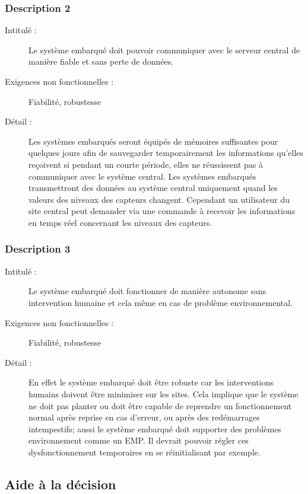 \subsubsection {Description 2}
\begin{description}
           \item[Intitulé :] Le système embarqué doit pouvoir communiquer avec le serveur central de manière fiable et sans perte de données.
           \item[Exigences non fonctionnelles :] Fiabilité, robustesse
           \item[Détail :] Les systèmes embarqués seront équipés de mémoires suffisantes pour quelques jours afin de sauvegarder temporairement les informations qu'elles reçoivent si pendant un courte période, elles ne réussissent pas à communiquer avec le système central. Les systèmes embarqués transmettront des données au système central uniquement quand les valeurs des niveaux des capteurs changent. Cependant un utilisateur du site central
peut demander via une commande à recevoir les informations en temps réel concernant les niveaux des capteurs.
\end{description}

\subsubsection {Description 3}
\begin{description}
           \item[Intitulé :] Le système embarqué doit fonctionner de manière autonome sans intervention humaine et cela même en cas de problème
environnemental.
           \item[Exigences non fonctionnelles :]Fiabilité, robustesse
           \item[Détail :] En effet le système embarqué doit être robuste car les interventions humains doivent être minimiser sur
les sites. Cela implique que le système ne doit pas planter ou doit être capable de reprendre un fonctionnement normal
après reprise en cas d'erreur, ou après des redémarrages intempestifs; aussi le système embarqué doit supporter des 
problèmes environnement comme un EMP. Il devrait pouvoir régler ces dysfonctionnement temporaires en se 
réinitialisant par exemple.
\end{description}


 \subsection {Aide à la décision}
